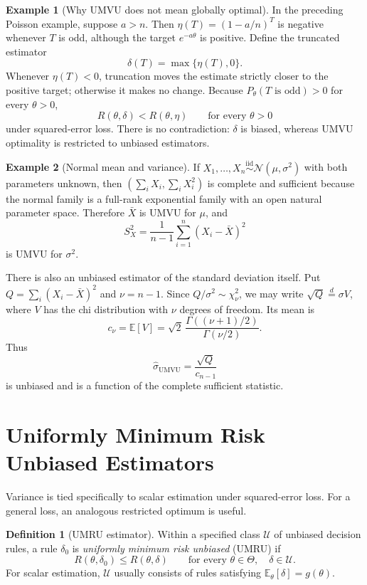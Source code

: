 \documentclass[12pt,oneside]{book}
\numberwithin{equation}{section}
\theoremstyle{definition}
\newtheorem{definition}{Definition}[section]
\newtheorem{example}{Example}[section]
\theoremstyle{plain}
\theoremstyle{remark}
\newcommand{\E}{\mathbb{E}}
\newcommand{\iid}{\overset{\text{iid}}{\sim}}
\newcommand{\Normal}{\mathcal{N}}
\begin{document}
\begin{example}[Why UMVU does not mean globally optimal]
In the preceding Poisson example, suppose $a>n$.  Then
$\eta(T)=(1-a/n)^T$ is negative whenever $T$ is odd, although the target
$e^{-a\theta}$ is positive.  Define the truncated estimator
\[
 \delta(T)=\max\{\eta(T),0\}.
\]
Whenever $\eta(T)<0$, truncation moves the estimate strictly closer to the
positive target; otherwise it makes no change.  Because
$P_\theta(T\text{ is odd})>0$ for every $\theta>0$,
\[
 R(\theta,\delta)<R(\theta,\eta)
 \qquad\text{for every }\theta>0
\]
under squared-error loss.  There is no contradiction: $\delta$ is biased,
whereas UMVU optimality is restricted to unbiased estimators.
\end{example}

\begin{example}[Normal mean and variance]
If $X_1,\ldots,X_n\iid\Normal(\mu,\sigma^2)$ with both parameters unknown,
then $(\sum_iX_i,\sum_iX_i^2)$ is complete and sufficient because the normal
family is a full-rank exponential family with an open natural parameter
space.  Therefore $\bar X$ is UMVU for $\mu$, and
\[
    S_X^2=\frac{1}{n-1}\sum_{i=1}^n(X_i-\bar X)^2
\]
is UMVU for $\sigma^2$.

There is also an unbiased estimator of the standard deviation itself.  Put
$Q=\sum_i(X_i-\bar X)^2$ and $\nu=n-1$.  Since
$Q/\sigma^2\sim\chi_\nu^2$, we may write
$\sqrt Q\overset{d}{=}\sigma V$, where $V$ has the chi distribution with $\nu$
degrees of freedom.  Its mean is
\[
 c_\nu=\E[V]
 =\sqrt2\,\frac{\Gamma((\nu+1)/2)}{\Gamma(\nu/2)}.
\]
Thus
\[
 \widehat\sigma_{\mathrm{UMVU}}
 =\frac{\sqrt Q}{c_{n-1}}
\]
is unbiased and is a function of the complete sufficient statistic.
\end{example}

\section{Uniformly Minimum Risk Unbiased Estimators}

Variance is tied specifically to scalar estimation under squared-error loss.
For a general loss, an analogous restricted optimum is useful.

\begin{definition}[UMRU estimator]
Within a specified class $\mathcal U$ of unbiased decision rules, a rule
$\delta_0$ is \emph{uniformly minimum risk unbiased} (UMRU) if
\[
    R(\theta,\delta_0)\leq R(\theta,\delta)
    \qquad\text{for every }\theta\in\Theta,
    \quad \delta\in\mathcal U.
\]
For scalar estimation, $\mathcal U$ usually consists of rules satisfying
$\E_\theta[\delta]=g(\theta)$.
\end{definition}
\end{document}
